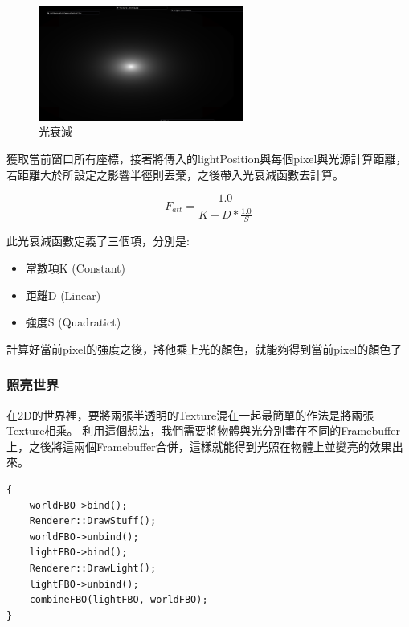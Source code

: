 \begin{figure}[h]
    \begin{center}
    \includegraphics[width=0.6\textwidth]{./resources/2D-Lighting/attenuation.png}
    \end{center}
\caption{光衰減}
\label{fig:attenuation}
\end{figure}

獲取當前窗口所有座標，接著將傳入的lightPosition與每個pixel與光源計算距離，若距離大於所設定之影響半徑則丟棄，之後帶入光衰減函數去計算。

\begin{equation} F_{att} = \frac{1.0}{K + D * \frac{1.0}{S}} \end{equation}

此光衰減函數定義了三個項，分別是:

\begin{itemize}
\item{常數項K (Constant)}
\item{距離D (Linear)}
\item{強度S (Quadratict)}
\end{itemize}

計算好當前pixel的強度之後，將他乘上光的顏色，就能夠得到當前pixel的顏色了

\subsubsection{照亮世界}

在2D的世界裡，要將兩張半透明的Texture混在一起最簡單的作法是將兩張Texture相乘。
利用這個想法，我們需要將物體與光分別畫在不同的Framebuffer上，之後將這兩個Framebuffer合併，這樣就能得到光照在物體上並變亮的效果出來。

\begin{lstlisting}
{
    worldFBO->bind();
    Renderer::DrawStuff();
    worldFBO->unbind();
    lightFBO->bind();
    Renderer::DrawLight();
    lightFBO->unbind();
    combineFBO(lightFBO, worldFBO);
}
\end{lstlisting}

